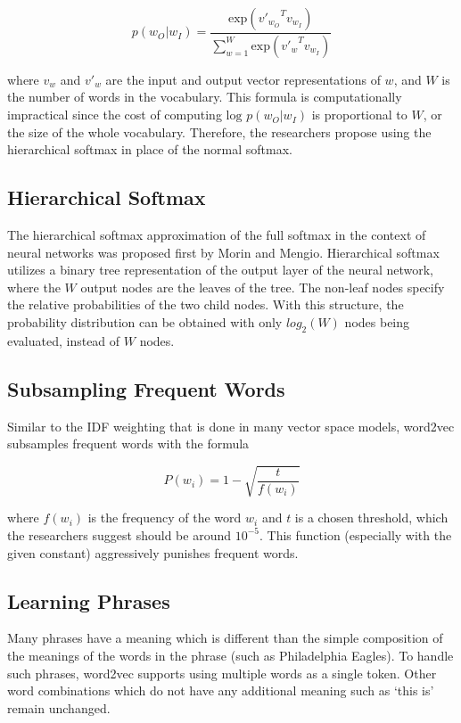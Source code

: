 \documentclass[12pt]{article}
\begin{document}
\[
p(w_O|w_I)=\frac{\textrm{exp}({v'_{w_O}}^{T}v_{w_I})}{\sum_{w=1}^W\textrm{exp}({v'_w}^{T}v_{w_I})}
\]

where $v_w$ and $v'_w$ are the input and output vector representations of $w$, and $W$ is the number of words in the vocabulary. This formula is computationally impractical since the cost of computing $ \textrm{log } p(w_O|w_I)$ is proportional to $W$, or the size of the whole vocabulary. Therefore, the researchers propose using the hierarchical softmax in place of the normal softmax.\cite{source2}

\subsection{Hierarchical Softmax}

The hierarchical softmax approximation of the full softmax in the context of neural networks was proposed first by Morin and Mengio.\cite{softmax} Hierarchical softmax utilizes a binary tree representation of the output layer of the neural network, where the $W$ output nodes are the leaves of the tree. The non-leaf nodes specify the relative probabilities of the two child nodes. With this structure, the probability distribution can be obtained with only $log_2(W)$ nodes being evaluated, instead of $W$ nodes.

\subsection{Subsampling Frequent Words}
Similar to the IDF weighting that is done in many vector space models, word2vec subsamples frequent words with the formula

\[
P(w_i)=1-\sqrt{\frac{t}{f(w_i)}}
\]

where $f(w_i)$ is the frequency of the word $w_i$ and $t$ is a chosen threshold, which the researchers suggest should be around $10^{-5}$.\cite{source2} This function (especially with the given constant) aggressively punishes frequent words.

\subsection{Learning Phrases}
Many phrases have a meaning which is different than the simple composition of the meanings of the words in the phrase (such as Philadelphia Eagles). To handle such phrases, word2vec supports using multiple words as a single token. Other word combinations which do not have any additional meaning such as `this is'  remain unchanged.\cite{source2}
\end{document}
